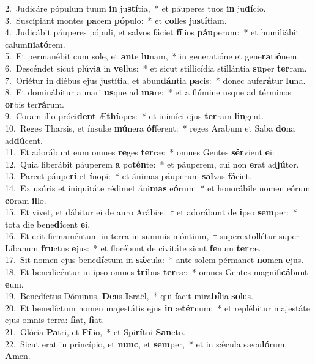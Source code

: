 {2.~}Judicáre pópulum tuum \textbf{in} ju\textbf{stí}tia,~* et páuperes tuos \textbf{in} ju\textbf{dí}cio.\\
{3.~}Suscípiant montes \textbf{pa}cem \textbf{pó}pulo:~* et \textbf{col}les ju\textbf{stí}tiam.\\
{4.~}Judicábit páuperes pópuli, et salvos fáciet \textbf{fí}lios \textbf{páu}perum:~* et humiliábit calum\textbf{ni}a\textbf{tó}rem.\\
{5.~}Et permanébit cum sole, et \textbf{an}te \textbf{lu}nam,~* in generatióne et gene\textbf{ra}ti\textbf{ó}nem.\\
{6.~}Descéndet sicut plúvi\textbf{a} in \textbf{vel}lus:~* et sicut stillicídia stillántia \textbf{su}per \textbf{ter}ram.\\
{7.~}Oriétur in diébus ejus justítia, et abun\textbf{dán}tia \textbf{pa}cis:~* donec aufe\textbf{rá}tur \textbf{lu}na.\\
{8.~}Et dominábitur a mari \textbf{us}que ad \textbf{ma}re:~* et a flúmine usque ad términos \textbf{or}bis ter\textbf{rá}rum.\\
{9.~}Coram illo próci\textbf{dent} Æ\textbf{thí}opes:~* et inimíci ejus \textbf{ter}ram \textbf{lin}gent.\\
{10.~}Reges Tharsis, et ínsulæ \textbf{mú}nera \textbf{óf}ferent:~* reges Arabum et Saba \textbf{do}na ad\textbf{dú}cent.\\
{11.~}Et adorábunt eum omnes \textbf{re}ges \textbf{ter}ræ:~* omnes Gentes \textbf{sér}vient \textbf{e}i:\\
{12.~}Quia liberábit páuperem \textbf{a} po\textbf{tén}te:~* et páuperem, cui non \textbf{e}rat ad\textbf{jú}tor.\\
{13.~}Parcet páupe\textbf{ri} et \textbf{í}nopi:~* et ánimas páuperum \textbf{sal}vas \textbf{fá}ciet.\\
{14.~}Ex usúris et iniquitáte rédimet áni\textbf{mas} e\textbf{ó}rum:~* et honorábile nomen eórum \textbf{co}ram \textbf{il}lo.\\
{15.~}Et vivet, et dábitur ei de auro Arábiæ,~† et adorábunt de \textbf{i}pso \textbf{sem}per:~* tota die bene\textbf{dí}cent \textbf{e}i.\\
{16.~}Et erit firmaméntum in terra in summis móntium,~† superextollétur super Líbanum \textbf{fru}ctus \textbf{e}jus:~* et florébunt de civitáte sicut \textbf{fe}num \textbf{ter}ræ.\\
{17.~}Sit nomen ejus bene\textbf{dí}ctum in \textbf{sǽ}cula:~* ante solem pérmanet \textbf{no}men \textbf{e}jus.\\
{18.~}Et benedicéntur in ipso omnes \textbf{tri}bus \textbf{ter}ræ:~* omnes Gentes magnifi\textbf{cá}bunt \textbf{e}um.\\
{19.~}Benedíctus Dóminus, \textbf{De}us \textbf{Is}raël,~* qui facit mira\textbf{bí}lia \textbf{so}lus.\\
{20.~}Et benedíctum nomen majestátis ejus \textbf{in} æ\textbf{tér}num:~* et replébitur majestáte ejus omnis terra: \textbf{fi}at, \textbf{fi}at.\\
{21.~}Glória \textbf{Pa}tri, et \textbf{Fí}lio,~* et Spi\textbf{rí}tui \textbf{San}cto.\\
{22.~}Sicut erat in princípio, et \textbf{nunc}, et \textbf{sem}per,~* et in sǽcula sæcu\textbf{ló}rum. \textbf{A}men.\\
